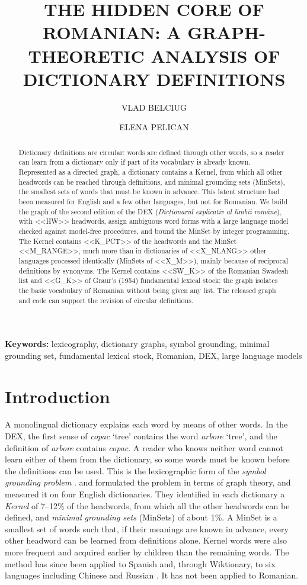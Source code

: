 \documentclass[11pt]{article}
\title{\textbf{THE HIDDEN CORE OF ROMANIAN: A GRAPH-THEORETIC ANALYSIS OF DICTIONARY DEFINITIONS}}
\author[1]{VLAD BELCIUG}
\author[1]{ELENA PELICAN}
\affil[1]{``Ovidius'' University of Constanța, Faculty of Mathematics and Informatics,\break Bd. Mamaia 124, Constanța, Romania
\break \texttt{vlad.belciug@365.univ-ovidius.ro, epelican@univ-ovidius.ro}}
\date{}
\newcommand{\keyword}[1]{\hspace{0.2cm}\fontsize{10}{12}\selectfont\textbf{Keywords: }}
\newcommand{\ro}[1]{\textit{#1}}
\begin{document}
\pagestyle{empty}
\maketitle
\thispagestyle{empty}
\begin{abstract}
Dictionary definitions are circular: words are defined through other words, so a reader can learn from a dictionary only if part of its vocabulary is already known. Represented as a directed graph, a dictionary contains a Kernel, from which all other headwords can be reached through definitions, and minimal grounding sets (MinSets), the smallest sets of words that must be known in advance. This latent structure had been measured for English and a few other languages, but not for Romanian. We build the graph of the second edition of the DEX (\ro{Dicționarul explicativ al limbii române}), with <<HW>> headwords, assign ambiguous word forms with a large language model checked against model-free procedures, and bound the MinSet by integer programming. The Kernel contains <<K_PCT>> of the headwords and the MinSet <<M_RANGE>>, much more than in dictionaries of <<X_NLANG>> other languages processed identically (MinSets of <<X_M>>), mainly because of reciprocal definitions by synonyms. The Kernel contains <<SW_K>> of the Romanian Swadesh list and <<G_K>> of Graur's (1954) fundamental lexical stock: the graph isolates the basic vocabulary of Romanian without being given any list. The released graph and code can support the revision of circular definitions.
\end{abstract}
\keyword{} lexicography, dictionary graphs, symbol grounding, minimal grounding set, fundamental lexical stock, Romanian, DEX, large language models

\section{Introduction}
A monolingual dictionary explains each word by means of other words. In the DEX, the first sense of \ro{copac} `tree' contains the word \ro{arbore} `tree', and the definition of \ro{arbore} contains \ro{copac}. A reader who knows neither word cannot learn either of them from the dictionary, so some words must be known before the definitions can be used. This is the lexicographic form of the \emph{symbol grounding problem} \cite{harnad1990}.  and  formulated the problem in terms of graph theory, and  measured it on four English dictionaries. They identified in each dictionary a \emph{Kernel} of 7--12\% of the headwords, from which all the other headwords can be defined, and \emph{minimal grounding sets} (MinSets) of about 1\%. A MinSet is a smallest set of words such that, if their meanings are known in advance, every other headword can be learned from definitions alone. Kernel words were also more frequent and acquired earlier by children than the remaining words. The method has since been applied to Spanish \cite{pichardo2017,kostiuk2023} and, through Wiktionary, to six languages including Chinese and Russian \cite{eschrich2024}. It has not been applied to Romanian.
\end{document}

